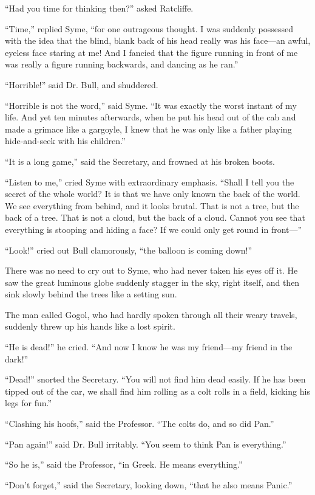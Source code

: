 \documentclass{book}
\begin{document}
“Had you time for thinking then?” asked Ratcliffe.

“Time,” replied Syme, “for one outrageous thought. I was suddenly possessed with the idea that the blind, blank back of his head really was his face—an awful, eyeless face staring at me! And I fancied that the figure running in front of me was really a figure running backwards, and dancing as he ran.”

“Horrible!” said Dr. Bull, and shuddered.

“Horrible is not the word,” said Syme. “It was exactly the worst instant of my life. And yet ten minutes afterwards, when he put his head out of the cab and made a grimace like a gargoyle, I knew that he was only like a father playing hide-and-seek with his children.”

“It is a long game,” said the Secretary, and frowned at his broken boots.

“Listen to me,” cried Syme with extraordinary emphasis. “Shall I tell you the secret of the whole world? It is that we have only known the back of the world. We see everything from behind, and it looks brutal. That is not a tree, but the back of a tree. That is not a cloud, but the back of a cloud. Cannot you see that everything is stooping and hiding a face? If we could only get round in front—”

“Look!” cried out Bull clamorously, “the balloon is coming down!”

There was no need to cry out to Syme, who had never taken his eyes off it. He saw the great luminous globe suddenly stagger in the sky, right itself, and then sink slowly behind the trees like a setting sun.

The man called Gogol, who had hardly spoken through all their weary travels, suddenly threw up his hands like a lost spirit.

“He is dead!” he cried. “And now I know he was my friend—my friend in the dark!”

“Dead!” snorted the Secretary. “You will not find him dead easily. If he has been tipped out of the car, we shall find him rolling as a colt rolls in a field, kicking his legs for fun.”

“Clashing his hoofs,” said the Professor. “The colts do, and so did Pan.”

“Pan again!” said Dr. Bull irritably. “You seem to think Pan is everything.”

“So he is,” said the Professor, “in Greek. He means everything.”

“Don’t forget,” said the Secretary, looking down, “that he also means Panic.”
\end{document}
